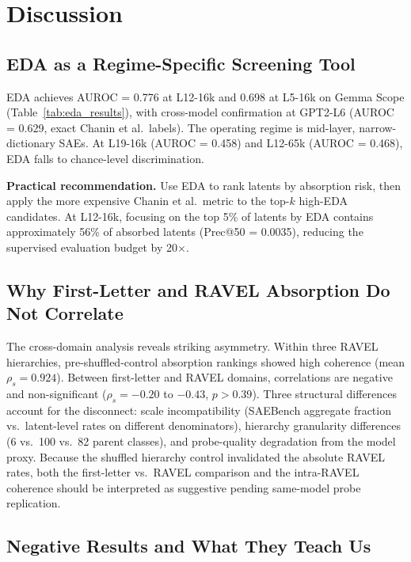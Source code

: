 \documentclass{article}
\begin{document}
\section{Discussion}

\subsection{EDA as a Regime-Specific Screening Tool}

EDA achieves AUROC = 0.776 at L12-16k and 0.698 at L5-16k on Gemma Scope (Table~\ref{tab:eda_results}), with cross-model confirmation at GPT2-L6 (AUROC = 0.629, exact Chanin et al.\ labels). The operating regime is mid-layer, narrow-dictionary SAEs. At L19-16k (AUROC = 0.458) and L12-65k (AUROC = 0.468), EDA falls to chance-level discrimination.

\textbf{Practical recommendation.} Use EDA to rank latents by absorption risk, then apply the more expensive Chanin et al.\ metric to the top-$k$ high-EDA candidates. At L12-16k, focusing on the top 5\% of latents by EDA contains approximately 56\% of absorbed latents (Prec@50 = 0.0035), reducing the supervised evaluation budget by 20$\times$.

\subsection{Why First-Letter and RAVEL Absorption Do Not Correlate}

The cross-domain analysis reveals striking asymmetry. Within three RAVEL hierarchies, pre-shuffled-control absorption rankings showed high coherence (mean $\rho_s = 0.924$). Between first-letter and RAVEL domains, correlations are negative and non-significant ($\rho_s = -0.20$ to $-0.43$, $p > 0.39$). Three structural differences account for the disconnect: scale incompatibility (SAEBench aggregate fraction vs.\ latent-level rates on different denominators), hierarchy granularity differences (6 vs.\ 100 vs.\ 82 parent classes), and probe-quality degradation from the model proxy. Because the shuffled hierarchy control invalidated the absolute RAVEL rates, both the first-letter vs.\ RAVEL comparison and the intra-RAVEL coherence should be interpreted as suggestive pending same-model probe replication.

\subsection{Negative Results and What They Teach Us}
\end{document}

